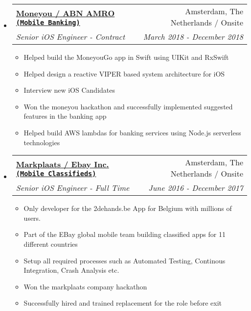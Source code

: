 \documentclass[letterpaper,11pt]{article}
\makeatletter
\newcommand{\resitem}[1]{\item #1 \vspace{-2pt}}
\newcommand{\ressubheading}[4]{
\begin{tabular*}{7.0in}{l@{\extracolsep{\fill}}r}
    \textbf{#1} & #2 \\
    \textit{#3} & \textit{#4} \\
\end{tabular*}\vspace{-6pt}}
\makeatother
\begin{document}
\begin{itemize}
    
\item
    \ressubheading{\href{https://www.moneyou.nl/}{Moneyou / ABN AMRO \texttt{(Mobile Banking)}}}{Amsterdam, The Netherlands / Onsite}{Senior iOS Engineer - Contract}{March 2018 - December 2018}
    \begin{itemize}
        \resitem{Helped build the MoneyouGo app in Swift using UIKit and RxSwift}
        \resitem{Helped design a reactive VIPER based system architecture for iOS}
        \resitem{Interview new iOS Candidates}
        \resitem{Won the moneyou hackathon and successfully implemented suggested features in the banking app}
        \resitem{Helped build AWS lambdas for banking services using Node.js serverless technologies}
    \end{itemize}
    
\item
    \ressubheading{\href{https://www.markplaats.nl/}{Markplaats / Ebay Inc. \texttt{(Mobile Classifieds)}}}{Amsterdam, The Netherlands / Onsite}{Senior iOS Engineer - Full Time}{June 2016 - December 2017}
    \begin{itemize}
        \resitem{Only developer for the 2dehands.be App for Belgium with millions of users.}
        \resitem{Part of the EBay global mobile team building classified apps for 11 different countries}
        \resitem{Setup all required processes such as Automated Testing, Continous Integration, Crash Analysis etc.}
        \resitem{Won the markplaats company hackathon}
        \resitem{Successfully hired and trained replacement for the role before exit}
    \end{itemize}


\end{itemize}

\vspace{0.3in}
\end{document}
